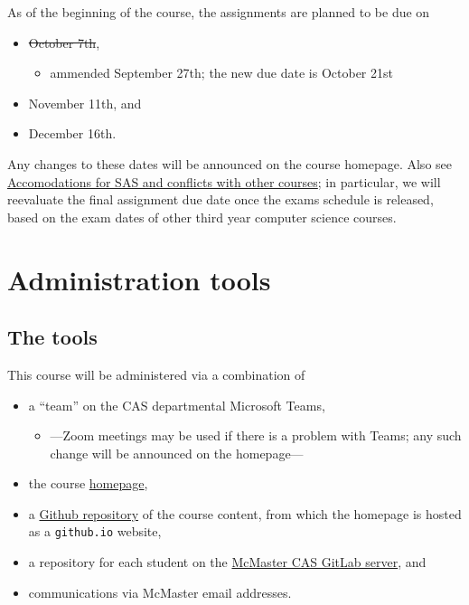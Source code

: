 \documentclass[11pt]{article}
\begin{document}
As of the beginning of the course,
the assignments are planned to be due on
\begin{itemize}
\item \sout{October 7th},
\begin{itemize}
\item ammended September 27th; the new due date is October 21st
\end{itemize}
\item November 11th, and
\item December 16th.
\end{itemize}

Any changes to these dates will be announced on the course homepage.
Also see \hyperref[sec:org11039e7]{Accomodations for SAS and conflicts with other courses};
in particular, we will reevaluate the final assignment due date
once the exams schedule is released, based on the exam dates
of other third year computer science courses.

\section{Administration tools}
\label{sec:org48c6304}
\subsection{The tools}
\label{sec:orgceafe3c}
This course will be administered via a combination of
\begin{itemize}
\item a “team” on the CAS departmental Microsoft Teams,
\begin{itemize}
\item —Zoom meetings may be used if there is a problem with Teams;
any such change will be announced on the homepage—
\end{itemize}
\item the course
\href{https://armkeh.github.io/principles-of-programming-languages/}{homepage},
\item a \href{https://github.com/armkeh/principles-of-programming-languages}{Github repository}
of the course content, from which
the homepage is hosted as a \texttt{github.io} website,
\item a repository for each student on the
\href{https://gitlab.cas.mcmaster.ca}{McMaster CAS GitLab server}, and
\item communications via McMaster email addresses.
\end{itemize}
\end{document}
